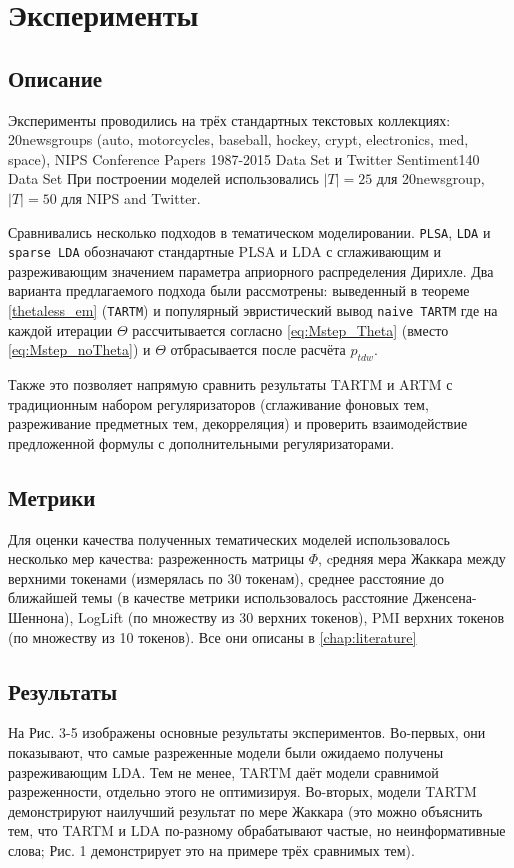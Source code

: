 \section{Эксперименты}
\subsection{Описание}
Эксперименты проводились на трёх стандартных текстовых коллекциях: 20newsgroups (auto,  motorcycles, baseball, hockey, crypt, electronics, med, space), NIPS Conference Papers 1987-2015 Data Set и Twitter Sentiment140 Data Set
При построении моделей использовались $\mid T\mid = 25$ для 20newsgroup, $\mid T\mid = 50$ для NIPS and Twitter.

Сравнивались несколько подходов в тематическом моделировании. \texttt{PLSA}, \texttt{LDA} и \texttt{sparse LDA} обозначают стандартные PLSA и LDA с сглаживающим и разреживающим значением параметра априорного распределения Дирихле. Два варианта предлагаемого подхода были рассмотрены: выведенный в теореме \ref{thetaless_em} (\texttt{TARTM}) и популярный эвристический вывод \texttt{naive TARTM} где на каждой итерации $\Theta$ рассчитывается согласно \eqref{eq:Mstep_Theta} (вместо \eqref{eq:Mstep_noTheta}) и $\Theta$ отбрасывается после расчёта $p_{tdw}$.


Также это позволяет напрямую сравнить результаты TARTM и ARTM с традиционным набором регуляризаторов (сглаживание фоновых тем, разреживание предметных тем, декорреляция) и проверить взаимодействие предложенной формулы с дополнительными регуляризаторами. 


\subsection{Метрики}

Для оценки качества полученных тематических моделей использовалось несколько мер качества: разреженность матрицы $\Phi$, cредняя мера Жаккара между верхними токенами (измерялась по 30 токенам), среднее расстояние до ближайшей темы (в качестве метрики использовалось расстояние Дженсена-Шеннона),  LogLift (по множеству из 30 верхних токенов), PMI верхних токенов (по множеству из 10 токенов). Все они описаны в \ref{chap:literature}

\subsection{Результаты}
На Рис. 3-5 изображены основные результаты экспериментов. Во-первых, они показывают, что  самые разреженные модели были ожидаемо получены разреживающим LDA. Тем не менее, TARTM даёт модели сравнимой разреженности, отдельно этого не оптимизируя. Во-вторых, модели TARTM демонстрируют наилучший результат по мере Жаккара (это можно объяснить тем, что TARTM и LDA по-разному обрабатывают  частые, но неинформативные слова; Рис. 1 демонстрирует это на примере трёх сравнимых тем).

